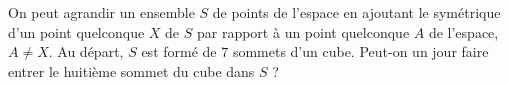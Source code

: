 On peut agrandir un ensemble $S$ de points de l'espace en ajoutant le symétrique d'un point quelconque $X$ de $S$ par rapport à un point quelconque $A$ de l'espace, $A \neq X$. Au départ, $S$ est formé de $7$ sommets d'un cube. Peut-on un jour faire entrer le huitième sommet du cube dans $S$ ?
